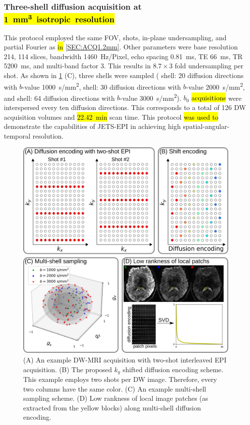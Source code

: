 \documentclass[preprint,12pt,authoryear,review]{elsarticle}
\begin{document}
    \subsubsection{Three-shell diffusion acquisition at \hl{\mbox{\SI{1}{\cubic\milli\meter} isotropic resolution}}}
    \label{SEC:ACQ1.0mm}
    This protocol employed the same FOV, shots,
    in-plane undersampling, and partial Fourier
    as \hl{in} \cref{SEC:ACQ1.2mm}. 
    Other parameters were base resolution 214, 114 slices, bandwidth \SI{1460}{Hz/Pixel},
    echo spacing \SI{0.81}{\milli\second}, TE \SI{66}{\milli\second}, TR \SI{5200}{ms},
    and multi-band factor $3$. This results in $8.7 \times 3$ fold undersampling per shot.
    As shown in \cref{FIG:sampling} (C), three shells were sampled
    ( shell: 20 diffusion directions with $b$-value \SI{1000}{s/mm^2},
     shell: 30 diffusion directions with $b$-value \SI{2000}{s/mm^2}, and
     shell: 64 diffusion directions with $b$-value \SI{3000}{s/mm^2}).
    $b_0$ \hl{acquisitions} were interspersed every ten diffusion directions.
    This corresponds to a total of 126 DW acquisition volumes and
    \hl{\mbox{\SI{22.42}{\minute}}} scan time.
    This protocol \hl{was used to} demonstrate 
    the capabilities of JETS-EPI in achieving high
    spatial-angular-temporal resolution.

    \begin{figure}
        \centering
        \includegraphics[width=\linewidth]{../figures/fig1.png}
        \caption{(A) An example DW-MRI acquisition
        with two-shot interleaved EPI acquisition.
        (B) The proposed $k_y$ shifted diffusion encoding scheme.
        This example employs two shots per DW image.
        Therefore, every two columns have the same color.
        (C) An example multi-shell sampling scheme.
        (D) Low rankness of local image patches (as extracted from the yellow blocks)
        along multi-shell diffusion encoding.}
        \label{FIG:sampling}
    \end{figure}
\end{document}
